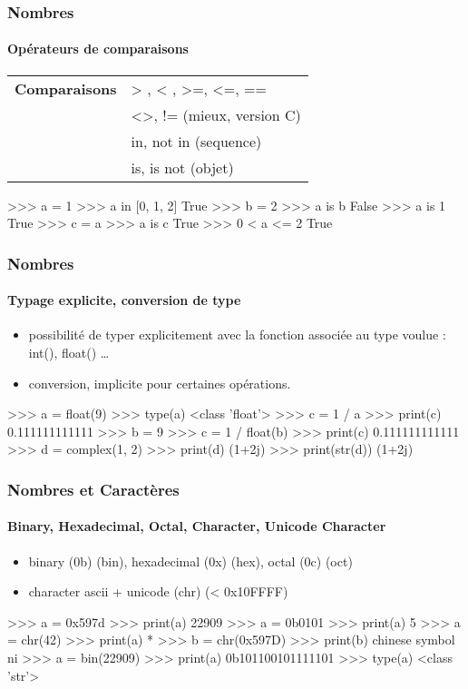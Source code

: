 \begin{frame}[fragile]
\frametitle{Nombres}
\framesubtitle{Opérateurs de comparaisons}
\begin{tabular}{ll}
{\bfseries Comparaisons} & > , < , >=, <=, == \\
 & <>, != (mieux, version C) \\
 & in, not in (sequence) \\
 & is, is not (objet) 
\end{tabular}
\begin{pythonConsole}
>>> a = 1 
>>> a in [0, 1, 2]
True
>>> b = 2
>>> a is b
False
>>> a is 1
True
>>> c = a
>>> a is c
True
>>> 0 < a <= 2
True
\end{pythonConsole}
\end{frame}
\begin{frame}[fragile]
\frametitle{Nombres}
\framesubtitle{Typage explicite, conversion de type}
\begin{itemize}
 \item possibilité de typer explicitement avec la fonction associée au type voulue : int(), float() \dots
 \item conversion, implicite pour certaines opérations. 
\end{itemize}
\begin{pythonConsole}
>>> a = float(9)
>>> type(a)
<class 'float'>
>>> c = 1 / a
>>> print(c)
0.111111111111
>>> b = 9
>>> c = 1 / float(b)
>>> print(c)
0.111111111111
>>> d = complex(1, 2)
>>> print(d)
(1+2j)
>>> print(str(d))
(1+2j)
\end{pythonConsole}
\end{frame}
\begin{frame}[fragile]
\frametitle{Nombres et Caractères}
\framesubtitle{Binary, Hexadecimal, Octal, Character, Unicode Character}
\begin{itemize}
 \item binary (0b) (bin), hexadecimal (0x) (hex), octal (0c) (oct) 
 \item character ascii + unicode (chr) (< 0x10FFFF) 
\end{itemize}
\begin{pythonConsole}
>>> a = 0x597d
>>> print(a)
22909
>>> a = 0b0101
>>> print(a)
5
>>> a = chr(42)
>>> print(a)
*
>>> b = chr(0x597D)
>>> print(b)
chinese symbol ni
>>> a = bin(22909)
>>> print(a)
0b101100101111101
>>> type(a)
<class 'str'>
\end{pythonConsole}
\end{frame}
